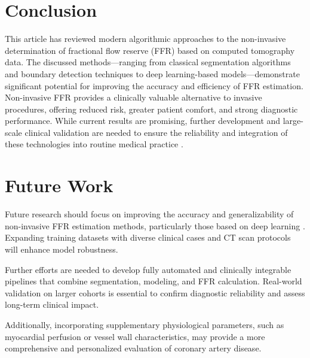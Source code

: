 \documentclass[default]{subfiles}
\begin{document}
\section{Conclusion}

This article has reviewed modern algorithmic approaches to the non-invasive determination of fractional flow reserve
(FFR) based on computed tomography data. The discussed methods—ranging from classical segmentation algorithms and
boundary detection techniques to deep learning-based models—demonstrate significant potential for improving the
accuracy and efficiency of FFR estimation. Non-invasive FFR provides a clinically valuable alternative to invasive
procedures, offering reduced risk, greater patient comfort, and strong diagnostic performance. While current results
are promising, further development and large-scale clinical validation are needed to ensure the reliability and
integration of these technologies into routine medical practice \cite{zhang_2025, }.

\section{Future Work}

Future research should focus on improving the accuracy and generalizability of non-invasive FFR estimation methods,
particularly those based on deep learning \cite{becker_2024, zhang_2025}. Expanding training datasets with diverse
clinical cases and CT scan protocols will enhance model robustness.

Further efforts are needed to develop fully automated and clinically integrable pipelines that combine segmentation,
modeling, and FFR calculation. Real-world validation on larger cohorts is essential to confirm diagnostic reliability
and assess long-term clinical impact.

Additionally, incorporating supplementary physiological parameters, such as myocardial perfusion or vessel wall
characteristics, may provide a more comprehensive and personalized evaluation of coronary artery disease.

\putbib[cite]

\makealttitle
\end{document}
